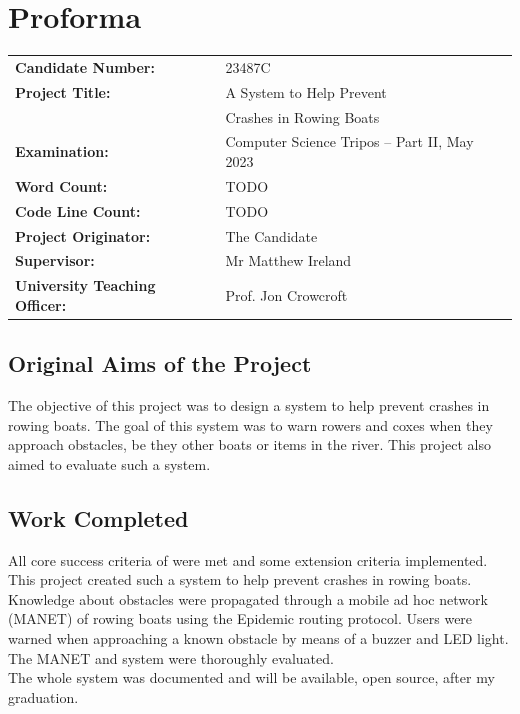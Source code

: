 \documentclass[12pt,a4paper]{report}
\begin{document}
\chapter*{Proforma}

{\large
\begin{tabular}{ll}
\bf Candidate Number:   & 23487C \\
\bf Project Title:  & A System to Help Prevent \\
& Crashes in Rowing Boats \\
\bf Examination:  & Computer Science Tripos -- Part II, May 2023      \\
\bf Word Count:    & TODO \\ %
\bf Code Line Count:    & TODO \\ %
\bf Project Originator: & The Candidate     \\
\bf Supervisor:         & Mr Matthew Ireland  \\ 
\bf University Teaching Officer:  & Prof. Jon Crowcroft \\ 
\end{tabular}
}


\section*{Original Aims of the Project}
The objective of this project was to design a system to help prevent crashes in rowing boats. The goal of this system was to warn rowers and coxes when they approach obstacles, be they other boats or items in the river. This project also aimed to evaluate such a system.

\section*{Work Completed}
All core success criteria of were met and some extension criteria implemented. \\ 
This project created such a system to help prevent crashes in rowing boats. Knowledge about obstacles were propagated through a mobile ad hoc network (MANET) of rowing boats using the Epidemic routing protocol. Users were warned when approaching a known obstacle by means of a buzzer and LED light. The MANET and system were thoroughly evaluated. \\
The whole system was documented and will be available, open source, after my graduation. \\ 
\end{document}
